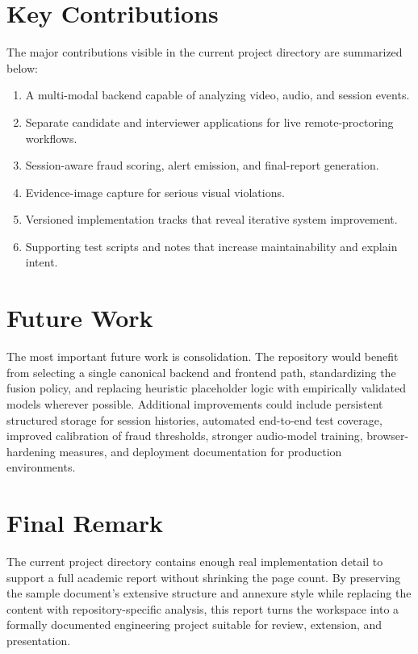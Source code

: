 \documentclass[12pt,a4paper]{extreport}
\begin{document}
\section{Key Contributions}
The major contributions visible in the current project directory are summarized below:
\begin{enumerate}
  \item A multi-modal backend capable of analyzing video, audio, and session events.
  \item Separate candidate and interviewer applications for live remote-proctoring workflows.
  \item Session-aware fraud scoring, alert emission, and final-report generation.
  \item Evidence-image capture for serious visual violations.
  \item Versioned implementation tracks that reveal iterative system improvement.
  \item Supporting test scripts and notes that increase maintainability and explain intent.
\end{enumerate}

\section{Future Work}
The most important future work is consolidation. The repository would benefit from selecting a single canonical backend and frontend path, standardizing the fusion policy, and replacing heuristic placeholder logic with empirically validated models wherever possible. Additional improvements could include persistent structured storage for session histories, automated end-to-end test coverage, improved calibration of fraud thresholds, stronger audio-model training, browser-hardening measures, and deployment documentation for production environments.

\section{Final Remark}
The current project directory contains enough real implementation detail to support a full academic report without shrinking the page count. By preserving the sample document's extensive structure and annexure style while replacing the content with repository-specific analysis, this report turns the workspace into a formally documented engineering project suitable for review, extension, and presentation.
\end{document}
